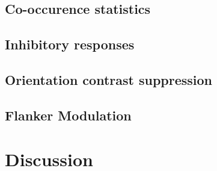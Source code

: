 \subsection{Co-occurence statistics}


\subsection{Inhibitory responses}


\subsection{Orientation contrast suppression}


\subsection{Flanker Modulation}


\section{Discussion}

